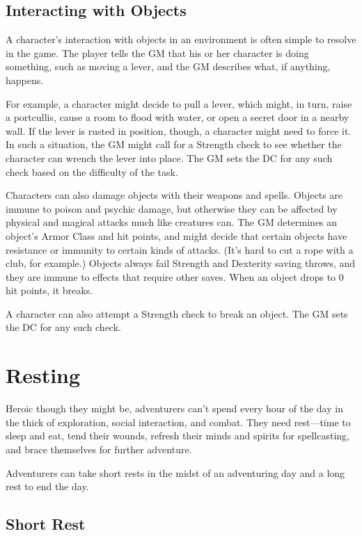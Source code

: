 \subsection{Interacting with Objects}

A character's interaction with objects in an environment is often simple to resolve in the game. The player tells the GM that his or her character is doing something, such as moving a lever, and the GM describes what, if anything, happens.

For example, a character might decide to pull a lever, which might, in turn, raise a portcullis, cause a room to flood with water, or open a secret door in a nearby wall. If the lever is rusted in position, though, a character might need to force it. In such a situation, the GM might call for a Strength check to see whether the character can wrench the lever into place. The GM sets the DC for any such check based on the difficulty of the task.

Characters can also damage objects with their weapons and spells. Objects are immune to poison and psychic damage, but otherwise they can be affected by physical and magical attacks much like creatures can. The GM determines an object's Armor Class and hit points, and might decide that certain objects have resistance or immunity to certain kinds of attacks. (It's hard to cut a rope with a club, for example.) Objects always fail Strength and Dexterity saving throws, and they are immune to effects that require other saves. When an object drops to 0 hit points, it breaks.

A character can also attempt a Strength check to break an object. The GM sets the DC for any such check.

\section{Resting}

Heroic though they might be, adventurers can't spend every hour of the day in the thick of exploration, social interaction, and combat. They need rest—time to sleep and eat, tend their wounds, refresh their minds and spirits for spellcasting, and brace themselves for further adventure.

Adventurers can take short rests in the midst of an adventuring day and a long rest to end the day.

\subsection{Short Rest}

